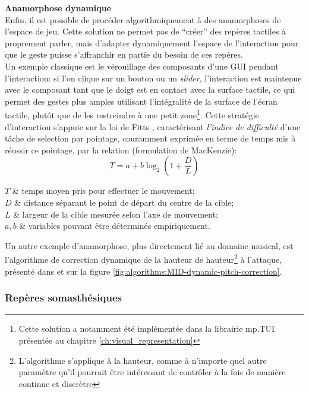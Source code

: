 \noindent\textbf{Anamorphose dynamique}\\
\noindent Enfin, il est possible de procéder algorithmiquement à des anamorphoses de l'espace de jeu. Cette solution ne permet pas de ``créer'' des repères tactiles à proprement parler, mais d'adapter dynamiquement l'espace de l'interaction pour que le geste puisse s'affranchir en partie du besoin de ces repères.\\
\indent Un exemple classique est le vérouillage des composants d'une \gls{GUI} pendant l'interaction: si l'on clique sur un bouton ou un \textit{slider}, l'interaction est maintenue avec le composant tant que le doigt est en contact avec la surface tactile, ce qui permet des gestes plus amples utilisant l'intégralité de la surface de l'écran tactile, plutôt que de les restreindre à une petit zone\footnote{Cette solution a notamment été implémentée dans la librairie mp.TUI présentée au chapitre \ref{ch:visual_representation}}. Cette stratégie d'interaction s'appuie sur la loi de Fitts \cite{fitts_information_1954}, caractérisant \textit{l'indice de difficulté} d'une tâche de selection par pointage, couramment exprimée en terme de temps mis à réussir ce pointage, par la relation (formulation de MacKenzie): 
$$ T = a + b \log_2 (1 + \frac{D}{L})$$
\vspace{-1em}
\begin{conditions}
$T$     	& temps moyen pris pour effectuer le mouvement; \\
$D$			& distance séparant le point de départ du centre de la cible;\\
$L$			& largeur de la cible mesurée selon l'axe de mouvement;\\
$a, b$  	& variables pouvant être déterminés empiriquement.
\end{conditions}

\noindent Un autre exemple d'anamorphose, plus directement lié au domaine musical, est l'algorithme de correction dynamique de la hauteur de hauteur\footnote{L'algorithme s'applique à la hauteur, comme à n'importe quel autre paramètre qu'il pourrait être intéressant de contrôler à la fois de manière continue et discrètre} à l'attaque, présenté dans \cite{goudard_playing_2014} et sur la figure \ref{fig:algorithms:MID-dynamic-pitch-correction}.

\subsubsection{Repères somasthésiques}

